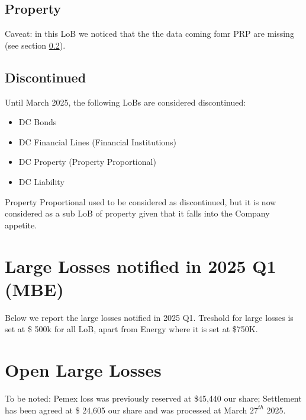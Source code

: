 \documentclass[a4paper,12pt]{article}
\begin{document}
\subsection{Property}
\label{subsec:data-per-subLoB-property}

Caveat: in this LoB we noticed that the the data coming fomr PRP are missing (see section \ref{subsec:data-per-subLoB-discontinued}).
\begin{small}
    
\end{small}


\subsection{Discontinued}
\label{subsec:data-per-subLoB-discontinued}
Until March 2025, the following LoBs are considered discontinued:
\begin{itemize}
    \item DC Bonds
    \item DC Financial Lines (Financial Institutions)
    \item DC Property (Property Proportional)
    \item DC Liability
\end{itemize}
Property Proportional used to be considered as discontinued, but it is now considered as a sub LoB of property given that it falls into the Company appetite.

\begin{small}
    
\end{small}

\section{Large Losses notified in 2025 Q1 (MBE)}
\label{sec:large-losses}

Below we report the large losses notified in 2025 Q1. Treshold for large losses is set at \$ 500k for all LoB, apart from Energy where it is set at \$750K.
\begin{small}
    
\end{small}

\section{Open Large Losses}
\label{sec:open-large-losses}
To be noted: Pemex loss was previously reserved at \$45,440 our share; Settlement has been agreed at \$ 24,605 our share and was processed at March $ \text{27}^{th} $ 2025.
\end{document}
